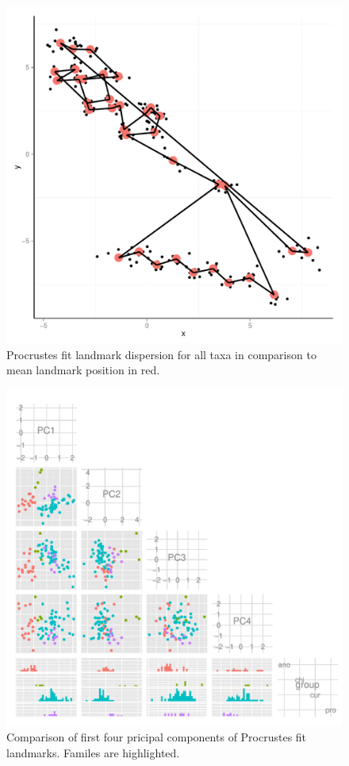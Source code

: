 \documentclass{article}\usepackage{graphicx, color}
\begin{document}
\begin{figure}[p]
  \centering
  \includegraphics[height = 0.4\textheight, keepaspectratio = true]{figure/pls-fits3}
  \caption{Procrustes fit landmark dispersion for all taxa in comparison to mean landmark position in red.}
  \label{fig:fish-fit}
\end{figure}



\begin{figure}[p]
  \centering
  \includegraphics[width= \textwidth, keepaspectratio = true]{figure/pca-plots5}
  \caption{Comparison of first four pricipal components of Procrustes fit landmarks. Familes are highlighted.}
  \label{fig:fish-pca}
\end{figure}
\end{document}
